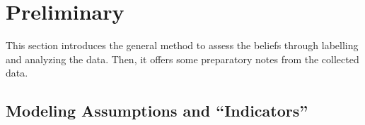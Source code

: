 \documentclass[conference,10pt]{IEEEtran}
\begin{document}

 
 

\section{Preliminary} 

This section introduces the general method to assess the beliefs through labelling and analyzing the data. Then, it offers some preparatory notes from the collected data.


\subsection{Modeling Assumptions and ``Indicators''}\label{model}
\end{document}
